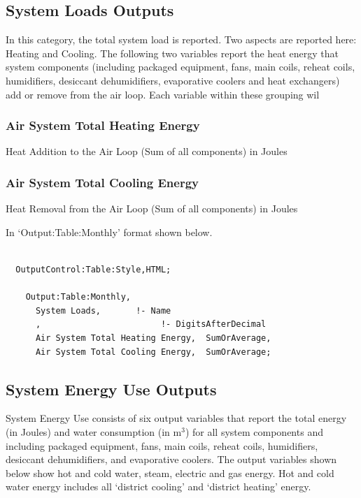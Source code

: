 \subsection{System Loads Outputs}\label{system-loads-outputs}

In this category, the total system load is reported. Two aspects are reported here: Heating and Cooling. The following two variables report the heat energy that system components (including packaged equipment, fans, main coils, reheat coils, humidifiers, desiccant dehumidifiers, evaporative coolers and heat exchangers) add or remove from the air loop. Each variable within these grouping wil

\subsubsection{Air System Total Heating Energy}\label{air-system-total-heating-energy}

Heat Addition to the Air Loop (Sum of all components) in Joules

\subsubsection{Air System Total Cooling Energy}\label{air-system-total-cooling-energy}

Heat Removal from the Air Loop (Sum of all components) in Joules

In `Output:Table:Monthly' format shown below.

\begin{lstlisting}

  OutputControl:Table:Style,HTML;

    Output:Table:Monthly,
      System Loads,       !- Name
      ,                        !- DigitsAfterDecimal
      Air System Total Heating Energy,  SumOrAverage,
      Air System Total Cooling Energy,  SumOrAverage;
\end{lstlisting}

\subsection{System Energy Use Outputs}\label{system-energy-use-outputs}

System Energy Use consists of six output variables that report the total energy (in Joules) and water consumption (in m\(^{3}\)) for all system components and including packaged equipment, fans, main coils, reheat coils, humidifiers, desiccant dehumidifiers, and evaporative coolers. The output variables shown below show hot and cold water, steam, electric and gas energy. Hot and cold water energy includes all `district cooling' and `district heating' energy.

